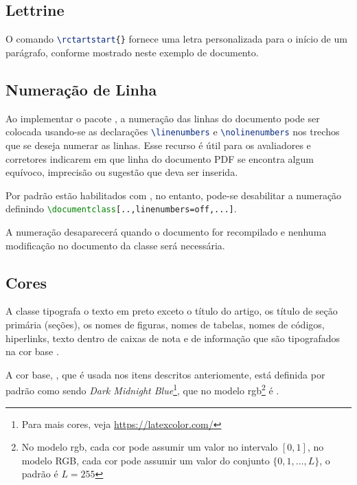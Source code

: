 \documentclass[12pt,a4paper,oneside,linenumbers=off,latinmodern=off,timesnews=off,spanish,english,portuges]{rctart-class/rctart}
\begin{document}
    \subsection{Lettrine}
    
        O comando \lstinline[language=TeX]|\rctartstart{}| fornece uma letra personalizada para o início de um parágrafo, conforme mostrado neste exemplo de documento.

    \subsection{Numeração de Linha}

        Ao implementar o pacote , a numeração das linhas do documento pode ser colocada usando-se as declarações \lstinline[language=TeX]|\linenumbers| e \lstinline[language=TeX]|\nolinenumbers| nos trechos que se deseja numerar as linhas. Esse recurso é útil para os avaliadores e corretores indicarem em que linha do documento PDF se encontra algum equívoco, imprecisão ou sugestão que deva ser inserida.

        Por padrão estão habilitados com , no entanto, pode-se desabilitar a numeração definindo \lstinline[language=TeX]|\documentclass[..,linenumbers=off,...]|.

        A numeração desaparecerá quando o documento for recompilado e nenhuma modificação no documento da classe será necessária.
        
        \subsection{Cores}
        
        A classe  tipografa o texto em preto exceto o título do artigo, os título de seção primária (seções), os nomes de figuras, nomes de tabelas, nomes de códigos, hiperlinks, texto dentro de caixas de nota e de informação que são tipografados na cor base .
        
        A cor base, , que é usada nos itens descritos anteriomente, está definida por padrão como sendo \textit{Dark Midnight Blue}\footnote{Para mais cores, veja \href{https://latexcolor.com/}{https://latexcolor.com/}}, que no modelo rgb\footnote{No modelo rgb, cada cor pode assumir um valor no intervalo $[0,1]$, no modelo RGB, cada cor pode assumir um valor do conjunto $\{0,1,\ldots,L\}$, o padrão é $L=255$ } é . 
        
\end{document}

